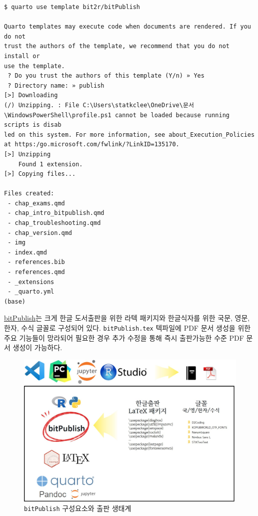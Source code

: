 \documentclass[
  letterpaper,
]{book}
\begin{document}
\begin{verbatim}
$ quarto use template bit2r/bitPublish

Quarto templates may execute code when documents are rendered. If you do not
trust the authors of the template, we recommend that you do not install or
use the template.
 ? Do you trust the authors of this template (Y/n) » Yes
 ? Directory name: » publish
[>] Downloading
(/) Unzipping. : File C:\Users\statkclee\OneDrive\문서\WindowsPowerShell\profile.ps1 cannot be loaded because running scripts is disab
led on this system. For more information, see about_Execution_Policies at https:/go.microsoft.com/fwlink/?LinkID=135170.
[>] Unzipping
    Found 1 extension.
[>] Copying files...

Files created:
 - chap_exams.qmd
 - chap_intro_bitpublish.qmd
 - chap_troubleshooting.qmd
 - chap_version.qmd
 - img
 - index.qmd
 - references.bib
 - references.qmd
 - _extensions
 - _quarto.yml
(base)
\end{verbatim}

\href{https://github.com/bit2r/bitPublish}{bitPublish}는 크게 한글
도서출판을 위한 라텍 패키지와 한글식자를 위한 국문, 영문, 한자, 수식
글꼴로 구성되어 있다. \texttt{bitPublish.tex} 텍파일에 PDF 문서 생성을
위한 주요 기능들이 망라되어 필요한 경우 추가 수정을 통해 즉시 출판가능한
수준 PDF 문서 생성이 가능하다.

\begin{figure}

{\centering \includegraphics{images/publishing_toolchain.jpg}

}

\caption{\texttt{bitPublish} 구성요소와 출판 생태계}

\end{figure}
\end{document}
